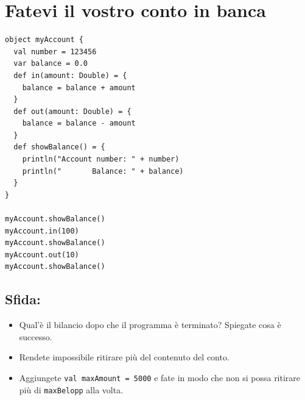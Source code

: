 \chapter{Fatevi il vostro conto in banca}
\begin{multicols}{2}

\begin{lstlisting}[basicstyle={\ttfamily\fontsize{16}{19}\selectfont},numbers=none]
object myAccount {
  val number = 123456
  var balance = 0.0
  def in(amount: Double) = {
    balance = balance + amount 
  }
  def out(amount: Double) = { 
    balance = balance - amount 
  }
  def showBalance() = {
    println("Account number: " + number) 
    println("       Balance: " + balance)
  }
}

myAccount.showBalance()
myAccount.in(100)
myAccount.showBalance()
myAccount.out(10)
myAccount.showBalance()
\end{lstlisting}
        


\columnbreak


\section*{\color{BrickRed}Sfida:}


\begin{itemize}

\item {Qual'è il bilancio dopo che il programma è terminato? Spiegate cosa è successo.}
\item {Rendete impossibile ritirare più del contenuto del conto.}
\item {Aggiungete \lstinline{val maxAmount = 5000} e fate in modo che non si possa ritirare più di \lstinline{maxBelopp} alla volta.}

\end{itemize}


\end{multicols}

